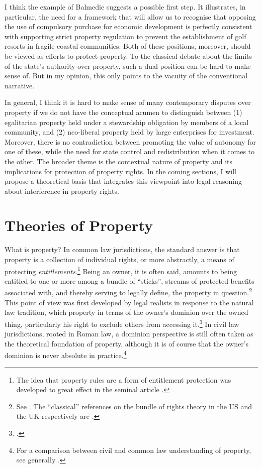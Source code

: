 I think the example of Balmedie suggests a possible first step. It illustrates, in particular, the need for a framework that will allow us to recognise that opposing the use of compulsory purchase for economic development is perfectly consistent with supporting strict property regulation to prevent the establishment of golf resorts in fragile coastal communities. Both of these positions, moreover, should be viewed as efforts to protect property. To the classical debate about the limits of the state's authority over property, such a dual position can be hard to make sense of. But in my opinion, this only points to the vacuity of the conventional narrative.

In general, I think it is hard to make sense of many contemporary disputes over property if we do not have the conceptual acumen to distinguish between (1) egalitarian property held under a stewardship obligation by members of a local community, and (2) neo-liberal property held by large enterprises for investment. Moreover, there is no contradiction between promoting the value of autonomy for one of these, while  the need for state control and redistribution when it comes to the other. The broader theme is the contextual nature of property and its implications for protection of property rights. In the coming sections, I will propose a theoretical basis that integrates this viewpoint into legal reasoning about interference in property rights.

\section{Theories of Property}\label{sec:top}

What is property? In common law jurisdictions, the standard answer is that property is a collection of individual rights, or more abstractly, a means of protecting {\it entitlements}.\footnote{The idea that property rules are a form of entitlement protection was developed to great effect in the seminal article \cite{calabresi72}.} Being an owner, it is often said, amounts to being entitled to one or more among a bundle of ``sticks'', streams of protected benefits associated with, and thereby serving to legally define, the property in question.\footnote{See \cite[357-358]{merrill01}. The ``classical'' references on the bundle of rights theory in the US and the UK respectively are \cite{hohfeld17,honore61}.} This point of view was first developed by legal realists in response to the natural law tradition, which  property in terms of the owner's dominion over the owned thing, particularly his right to exclude others from accessing it.\footcite[193-195]{klein11} In civil law jurisdictions, rooted in Roman law, a dominion perspective is still often taken as the theoretical foundation of property, although it is of course  that the owner's dominion is never absolute in practice.\footnote{For a comparison between civil and common law understanding of property, see generally \cite{chang12}.}

